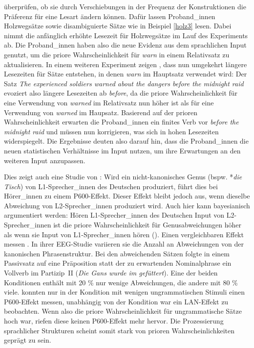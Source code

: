 \textcite{Fine.2013} überprüfen, ob sie durch Verschiebungen in der Frequenz der Konstruktionen die Präferenz für eine Lesart ändern können. Dafür lassen \textcite[2280--2281]{Fine.2013} Proband\_innen Holzwegsätze sowie disambiguierte Sätze wie in Beispiel \ref{holz3} lesen. Dabei nimmt die anfänglich erhöhte Lesezeit für Holzwegsätze im Lauf des Experiments ab. Die Proband\_innen haben also die neue Evidenz aus dem sprachlichen Input genutzt, um die priore Wahrscheinlichkeit für \textit{warn} in einem Relativsatz zu aktualisieren. In einem weiteren Experiment zeigen \textcite[2281--2283]{Fine.2013}, dass nun umgekehrt längere Lesezeiten für Sätze entstehen, in denen \textit{warn} im Hauptsatz verwendet wird: Der Satz \textit{The experienced soldiers warned about the dangers before the midnight raid} evoziert also längere Lesezeiten ab \textit{before}, da die priore Wahrscheinlichkeit für eine Verwendung von \textit{warned} im Relativsatz nun höher ist als für eine Verwendung von \textit{warned} im Haupsatz. Basierend auf der prioren Wahrscheinlichkeit erwarten die Proband\_innen ein finites Verb vor \textit{before the midnight raid} und müssen nun korrigieren, was sich in hohen Lesezeiten widerspiegelt. Die Ergebnisse deuten also darauf hin, dass die Proband\_innen die neuen statistischen Verhältnisse im Input nutzen, um ihre Erwartungen an den weiteren Input anzupassen.

Dies zeigt auch eine Studie von \textcite{Hanulikova.2012}: Wird ein nicht-kanoni\-sches Genus (bspw. *\textit{die Tisch}) von L1-Sprecher\_innen des Deutschen produziert, führt dies bei Hörer\_innen zu einem P600-Effekt. Dieser Effekt bleibt jedoch aus, wenn dieselbe Abweichung von L2-Sprecher\_innen produziert wird. Auch hier kann bayesianisch argumentiert werden: Hören L1-Sprecher\_innen des Deutschen Input von L2-Sprecher\_innen ist die priore Wahrscheinlichkeit für Genusabweichungen höher als wenn sie Input von L1-Sprecher\_innen hören (\cite[879--880]{Hanulikova.2012}). Einen vergleichbaren Effekt messen \textcite{Hahne.1999}. In ihrer EEG-Studie variieren sie die Anzahl an Abweichungen von der kanonischen Phrasenstruktur. Bei den abweichenden Sätzen folgte in einem Passivsatz auf eine Präposition statt der zu erwartenden Nominalphrase ein Vollverb im Partizip~II (\textit{Die Gans wurde im gefüttert}). Eine der beiden Konditionen enthält mit 20 \% nur wenige Abweichungen, die andere mit 80 \% viele. \textcite[196--199]{Hahne.1999} konnten nur in der Kondition mit wenigen ungrammatischen Stimuli einen P600-Effekt messen, unabhängig von der Kondition war ein LAN-Effekt zu beobachten. Wenn also die priore Wahrscheinlichkeit für ungrammatische Sätze hoch war, riefen diese keinen P600-Effekt mehr hervor. Die Prozessierung sprachlicher Strukturen scheint somit stark von prioren Wahrscheinlichkeiten geprägt zu sein.

